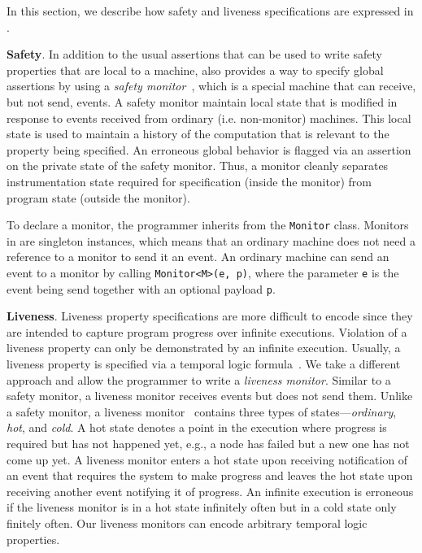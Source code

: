 In  this section, we describe how safety and liveness specifications are expressed in \psharp.

\textbf{Safety}.
In addition to the usual assertions that can be used to write safety properties that are local to a machine, \psharp also provides a way to specify global assertions by using a \emph{safety monitor}~\cite{desai2015building}, which is a special machine that can receive, but not send, events. A safety monitor maintain local state that is modified in response to events received from ordinary (i.e. non-monitor) machines. This local state is used to maintain a history of the computation that is relevant to the property being specified. An erroneous global behavior is flagged via an assertion on the private state of the safety monitor. 
Thus, a monitor cleanly separates instrumentation state required for specification (inside the monitor) from program state (outside the monitor).

To declare a monitor, the programmer inherits from the \psharp \texttt{Monitor} class. Monitors in \psharp are singleton instances, which means that an ordinary machine does not need a reference to a monitor to send it an event. An ordinary machine can send an event to a monitor by calling \texttt{Monitor<M>(e, p)}, where the parameter \texttt{e} is the event being send together with an optional payload \texttt{p}.

\textbf{Liveness}.
Liveness property specifications are more difficult to encode since they are intended to capture program progress
over infinite executions.
Violation of a liveness property can only be demonstrated by an infinite execution.
Usually, a liveness property is specified via a temporal logic formula~\cite{Pnueli1977,lamport1994temporal}.
We take a different approach and allow the programmer to write a \emph{liveness monitor}.
Similar to a safety monitor, a liveness monitor receives events but does not send them.
Unlike a safety monitor, a liveness monitor~\cite{desai2015building}
contains three types of states---\emph{ordinary}, \emph{hot}, and \emph{cold}.
A hot state denotes a point in the execution where progress is required but has not happened yet,
e.g., a node has failed but a new one has not come up yet.
A liveness monitor enters a hot state upon receiving notification of an event that requires the system
to make progress and leaves the hot state upon receiving another event notifying it of progress.
An infinite execution is erroneous if the liveness monitor is in a hot state infinitely often but in a cold state only finitely often.
Our liveness monitors can encode arbitrary temporal logic properties.

